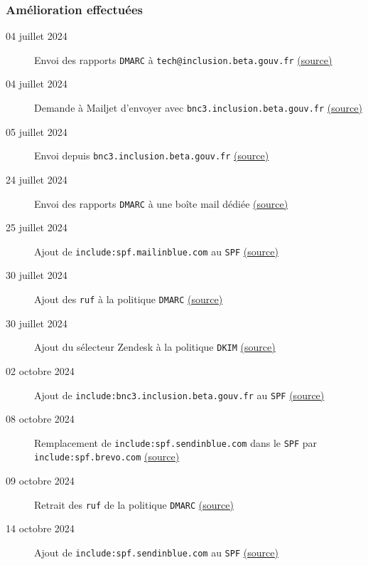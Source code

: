 \documentclass{beamer}
\begin{document}
\begin{frame}[fragile]
    \frametitle{Amélioration effectuées}
    \begin{description}
        \item[\footnotesize 04 juillet 2024] \small Envoi des rapports \texttt{DMARC} à \texttt{tech@inclusion.beta.gouv.fr} \href{https://itou-inclusion.slack.com/archives/C0412CTV63D/p1720017179142469}{(source)}
        \item[\footnotesize 04 juillet 2024] \small Demande à Mailjet d'envoyer avec \texttt{bnc3.inclusion.beta.gouv.fr} \href{https://app.mailjet.com/support/ticket/3086287}{(source)}
        \item[\footnotesize 05 juillet 2024] \small Envoi depuis \texttt{bnc3.inclusion.beta.gouv.fr} \href{https://app.mailjet.com/support/ticket/3086287}{(source)}
        \item[\footnotesize 24 juillet 2024] \small Envoi des rapports \texttt{DMARC} à une boîte mail dédiée \href{https://itou-inclusion.slack.com/archives/C0412CTV63D/p1721642195612449}{(source)}
        \item[\footnotesize 25 juillet 2024] \small Ajout de \texttt{include:spf.mailinblue.com} au \texttt{SPF} \href{https://mattermost.incubateur.net/betagouv/pl/cd8qzuqf63g7pxx61atwxs5hby}{(source)}
        \item[\footnotesize 30 juillet 2024] \small Ajout des \texttt{ruf} à la politique \texttt{DMARC} \href{https://itou-inclusion.slack.com/archives/C0412CTV63D/p1722332747632659}{(source)}
        \item[\footnotesize 30 juillet 2024] \small Ajout du sélecteur Zendesk à la politique \texttt{DKIM} \href{https://itou-inclusion.slack.com/archives/C01AQKD7MAN/p1722332999335309}{(source)}
        \item[\footnotesize 02 octobre 2024] \small Ajout de \texttt{include:bnc3.inclusion.beta.gouv.fr} au \texttt{SPF} \href{https://itou-inclusion.slack.com/docs/TQ3MK2T9S/F07Q3HANGTE}{(source)}
        \item[\footnotesize 08 octobre 2024] \small Remplacement de \texttt{include:spf.sendinblue.com} dans le \texttt{SPF} par \texttt{include:spf.brevo.com} \href{https://mattermost.incubateur.net/betagouv/pl/8ys763r4ijygb81asch4sf5kxc}{(source)}
        \item[\footnotesize 09 octobre 2024] \small Retrait des \texttt{ruf} de la politique \texttt{DMARC} \href{https://itou-inclusion.slack.com/archives/C0412CTV63D/p1728461567901209}{(source)}
        \item[\footnotesize 14 octobre 2024] \small Ajout de \texttt{include:spf.sendinblue.com} au \texttt{SPF} \href{https://itou-inclusion.slack.com/archives/C0412CTV63D/p1728907637846489}{(source)}

\end{description}
\end{frame}
\end{document}
